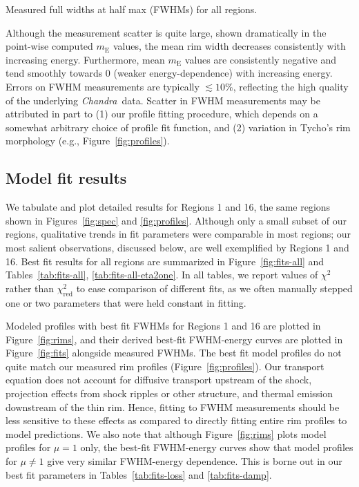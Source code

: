 \documentclass[manuscript]{aastex}  %
\newcommand*{\mt}{\mathrm}
\newcommand*{\Chandra}{\textit{Chandra}\ }
\newcommand*{\mE}{m_\mt{E}}
\begin{document}
\begin{table*}
    \iftoggle{manuscript}{
        \tiny
    }{
        \scriptsize
    }
    \centering
    \caption{Measured full widths at half max (FWHMs) for all regions.
             \label{tab:fwhms}}
    
\end{table*}

Although the measurement scatter is quite large, shown dramatically in the
point-wise computed $\mE$ values, the mean rim width decreases consistently
with increasing energy.  Furthermore, mean $\mE$ values are consistently
negative and tend smoothly towards $0$ (weaker energy-dependence) with
increasing energy.  Errors on FWHM measurements are typically $\lesssim 10\%$,
reflecting the high quality of the underlying \Chandra data.  Scatter in FWHM
measurements may be attributed in part to (1) our profile fitting procedure,
which depends on a somewhat arbitrary choice of profile fit function, and (2)
variation in Tycho's rim morphology (e.g., Figure~\ref{fig:profiles}).

\subsection{Model fit results}
\label{sec:fit-results}

We tabulate and plot detailed results for Regions 1 and 16, the same regions
shown in Figures~\ref{fig:spec} and \ref{fig:profiles}.  Although only a small
subset of our regions, qualitative trends in fit parameters were comparable in
most regions; our most salient observations, discussed below, are well
exemplified by Regions 1 and 16.  Best fit results for all regions are
summarized in Figure~\ref{fig:fits-all} and Tables~\ref{tab:fits-all},
\ref{tab:fits-all-eta2one}.  In all tables, we report values of $\chi^2$ rather
than $\chi^2_\mt{red}$ to ease comparison of different fits, as we often
manually stepped one or two parameters that were held constant in fitting.

Modeled profiles with best fit FWHMs for Regions 1 and 16 are plotted in
Figure~\ref{fig:rims}, and their derived best-fit FWHM-energy curves
are plotted in Figure~\ref{fig:fits} alongside measured FWHMs.
The best fit model profiles do not quite match our measured rim profiles
(Figure~\ref{fig:profiles}).  Our transport equation does not account for
diffusive transport upstream of the shock, projection effects from shock
ripples or other structure, and thermal emission downstream of the thin rim.
Hence, fitting to FWHM measurements should be less sensitive to these effects
as compared to directly fitting entire rim profiles to model predictions.
We also note that although Figure~\ref{fig:rims} plots model profiles for
$\mu = 1$ only, the best-fit FWHM-energy curves show that model profiles for
$\mu \neq 1$ give very similar FWHM-energy dependence.  This is borne out in
our best fit parameters in Tables~\ref{tab:fits-loss} and \ref{tab:fits-damp}.
\end{document}
